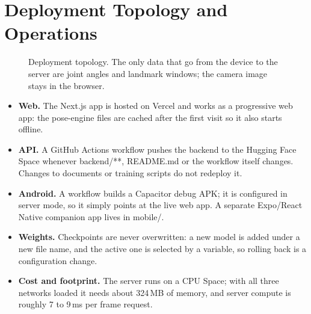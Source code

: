 \documentclass[11pt,a4paper]{article}
\newcommand{\ubrk}{\textunderscore\allowbreak}
\DeclareRobustCommand{\code}[1]{{\ttfamily\small\let\_\ubrk #1}}
\begin{document}
\section{Deployment Topology and Operations}
\begin{figure}[ht]
\centering
{}
\caption{Deployment topology. The only data that go from the device to the server are joint angles and landmark windows; the camera image stays in the browser.}
\end{figure}

\begin{itemize}
\item \textbf{Web.} The Next.js app is hosted on Vercel and works as a progressive web app: the pose-engine files are cached after the first visit so it also starts offline.
\item \textbf{API.} A GitHub Actions workflow pushes the backend to the Hugging Face Space whenever \code{backend/**}, \code{README.md} or the workflow itself changes. Changes to documents or training scripts do not redeploy it.
\item \textbf{Android.} A workflow builds a Capacitor debug APK; it is configured in server mode, so it simply points at the live web app. A separate Expo/React Native companion app lives in \code{mobile/}.
\item \textbf{Weights.} Checkpoints are never overwritten: a new model is added under a new file name, and the active one is selected by a variable, so rolling back is a configuration change.
\item \textbf{Cost and footprint.} The server runs on a CPU Space; with all three networks loaded it needs about 324\,MB of memory, and server compute is roughly 7 to 9\,ms per frame request.
\end{itemize}
\end{document}

